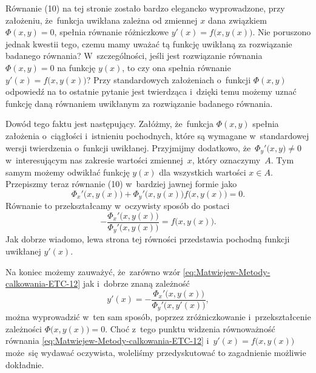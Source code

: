 \documentclass[a4paper,11pt]{article}
\begin{document}
\noindent
{} Równanie (10) na tej stronie zostało bardzo elegancko wyprowadzone,
przy założeniu, że~funkcja uwikłana zależna od zmiennej $x$ dana związkiem
$\Phi( x, y ) = 0$, spełnia równanie różniczkowe
$y'( x ) = f\big( x, y( x ) \big)$. Nie poruszono jednak kwestii tego, czemu
mamy uważać tą funkcję uwikłaną za rozwiązanie badanego równania?
W~szczególności, jeśli jest rozwiązanie równania $\Phi( x, y ) = 0$ na funkcję
$y( x )$, to czy ona spełnia równanie $y'( x ) = f\big( x, y( x ) \big)$?
Przy standardowych założeniach o~funkcji $\Phi( x, y )$ odpowiedź na to
ostatnie pytanie jest twierdząca i~dzięki temu możemy uznać funkcję daną
równaniem uwikłanym za rozwiązanie badanego równania.

Dowód tego faktu jest następujący. Załóżmy, że~funkcja $\Phi( x, y )$ spełnia
założenia o~ciągłości i~istnieniu pochodnych, które są wymagane
w~standardowej wersji twierdzenia o~funkcji uwikłanej. Przyjmijmy dodatkowo,
że~$\Phi_{ y }'\big( x, y \big) \neq 0$ w~interesującym nas zakresie wartości
zmiennej~$x$, który oznaczymy~$A$. Tym samym możemy odwikłać funkcję
$y( x )$ dla wszystkich wartości $x \in A$. Przepiszmy teraz równanie (10)
w~bardziej jawnej formie jako
\begin{equation}
  \label{eq:Matwiejew-Metody-calkowania-ETC-12}
  \Phi_{ x }'\big( x, y( x ) \big) +
  \Phi_{ y }'\big( x, y( x ) \big) f\big( x, y( x ) \big) = 0.
\end{equation}
Równanie to przekształcamy w~oczywisty sposób do postaci
\begin{equation}
  \label{eq:Matwiejew-Metody-calkowania-ETC-13}
  -\frac{ \Phi_{ x }'\big( x, y( x ) \big) }
  { \Phi_{ y }'\big( x, y( x ) \big) } =
  f\big( x, y( x ) \big).
\end{equation}
Jak dobrze wiadomo, lewa strona tej równości przedstawia pochodną funkcji
uwikłanej $y'( x )$.

Na koniec możemy zauważyć, że~zarówno wzór
\eqref{eq:Matwiejew-Metody-calkowania-ETC-12} jak i~dobrze znaną zależność
\begin{equation}
  \label{eq:Matwiejew-Metody-calkowania-ETC-14}
  y'( x ) =
  -\frac{ \Phi_{ x }'\big( x, y( x ) \big) }{ \Phi_{ y }'\big( x, y'( x ) \big) },
\end{equation}
można wyprowadzić w~ten sam sposób, poprzez zróżniczkowanie
i~przekształcenie zależności $\Phi\big( x, y( x ) \big) = 0$. Choć z~tego
punktu widzenia równoważność równania
\eqref{eq:Matwiejew-Metody-calkowania-ETC-12}
i~$y'( x ) = f\big( x, y( x ) \big)$ może~się wydawać oczywista, woleliśmy
przedyskutować to zagadnienie możliwie dokładnie.
\end{document}
